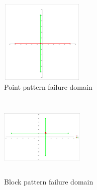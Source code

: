 \documentclass{acm_proc_article-sp}
\begin{document}


\begin{figure}[htp]
\centering
\includegraphics[width=4cm,height=4cm]{point_pattern.png}
\caption{Point pattern failure domain}
\label{fig:patterns}
\end{figure}




\begin{figure}[htp]
\centering
\includegraphics[width=4cm,height=4cm]{block_pattern.png}
\caption{Block pattern failure domain}
\label{fig:patterns}
\end{figure}



\end{document}
